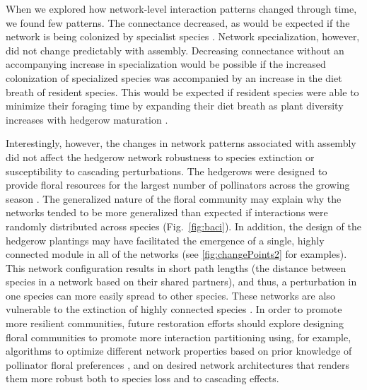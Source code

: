 \documentclass[12pt]{article}
\begin{document}
When we explored how network-level interaction patterns changed
through time, we found few patterns. The connectance decreased, as
would be expected if the network is being colonized by specialist
species \citep{mgonigle-2015-x}. Network specialization, however, did
not change predictably with assembly. Decreasing connectance without
an accompanying increase in specialization would be possible if the
increased colonization of specialized species was accompanied by an
increase in the diet breath of resident species. This would be
expected if resident species were able to minimize their foraging time
by expanding their diet breath as plant diversity increases with
hedgerow maturation \citep{Waser1996, pyke1984optimal, Bluthgen2007,
  albrecht2010plant}.

Interestingly, however, the changes in network patterns associated
with assembly did not affect the hedgerow network robustness to
species extinction or susceptibility to cascading perturbations. The
hedgerows were designed to provide floral resources for the largest
number of pollinators across the growing season
\citep{menz-2010-4}. The generalized nature of the floral community
may explain why the networks tended to be more generalized than
expected if interactions were randomly distributed across species
(Fig.~\ref{fig:baci}). In addition, the design of the hedgerow
plantings may have facilitated the emergence of a single, highly
connected module in all of the networks (see \ref{fig:changePoints2}
for examples). This network configuration results in short path
lengths (the distance between species in a network based on their
shared partners), and thus, a perturbation in one species can more
easily spread to other species. These networks are also vulnerable to
the extinction of highly connected species \citep{Burgos2007}. In
order to promote more resilient communities, future restoration
efforts should explore designing floral communities to promote more
interaction partitioning using, for example, algorithms to optimize
different network properties based on prior knowledge of pollinator
floral preferences \citep{mgonigle2016tool}, and on desired network
architectures that renders them more robust both to species loss and
to cascading effects.


\end{document}
